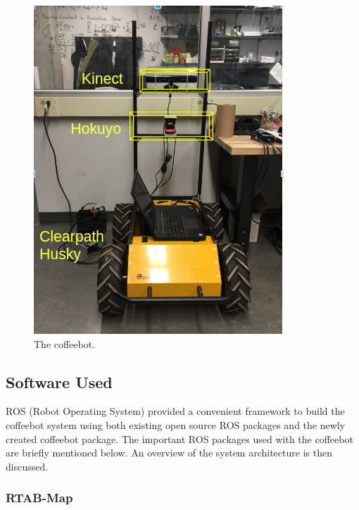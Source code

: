 \documentclass[letterpaper, 10 pt, conference]{ieeeconf}  %
\begin{document}
	\begin{figure}[!ht]
		\centering
		\includegraphics[width=1.0\columnwidth]{Figures/hardware_setup}
		\caption{The coffeebot.}
		\label{hardware}
	\end{figure}

\subsection{Software Used}

ROS (Robot Operating System) provided a convenient framework to build the coffeebot system using both existing open source ROS packages and the newly created coffeebot package. The important ROS packages used with the coffeebot are briefly mentioned below. An overview of the system architecture is then discussed.

\subsubsection{RTAB-Map}
\end{document}
